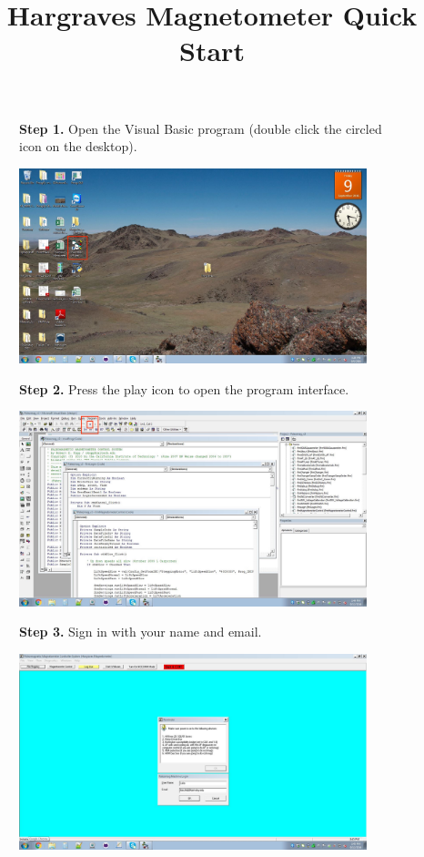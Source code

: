 \documentclass[11pt,letterpaper]{article}
\title{Hargraves Magnetometer Quick Start}
\begin{document}
\begin{figure}
\vspace*{10pt}
\begin{flushleft}
\textbf{Step 1.}
Open the Visual Basic program (double click the circled icon on the desktop).
\end{flushleft}
\centering
\includegraphics[width=0.9\textwidth]{images/Capture.jpg}
\end{figure}

\begin{figure}
\begin{flushleft}
\textbf{Step 2.}
Press the play icon to open the program interface.
\end{flushleft}
\centering
\includegraphics[width=0.9\textwidth]{images/Capture1.jpg}
\end{figure}

\begin{figure}
\begin{flushleft}
\textbf{Step 3.}
Sign in with your name and email.
\end{flushleft}
\centering
\includegraphics[width=0.9\textwidth]{images/Capture2.jpg}
\end{figure}
\end{document}
